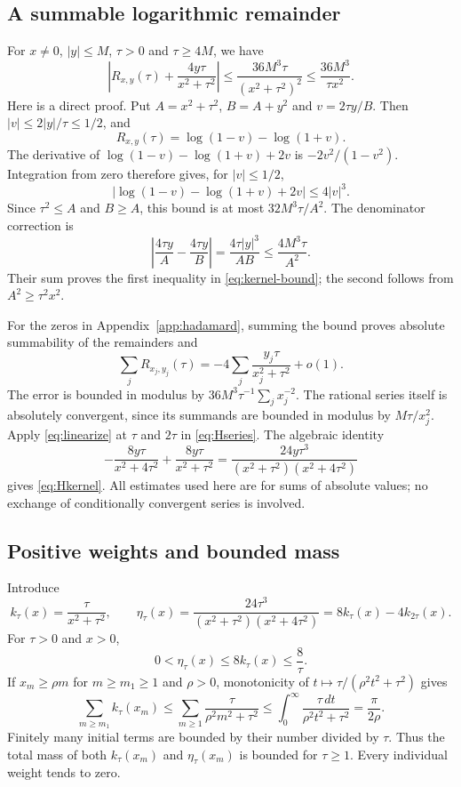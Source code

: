 \documentclass[11pt,a4paper]{article}
\theoremstyle{definition}
\theoremstyle{remark}
\numberwithin{equation}{section}
\begin{document}
\subsection{A summable logarithmic remainder}
For $x\ne0$, $|y|\le M$, $\tau>0$ and $\tau\ge4M$, we have
\begin{equation}\label{eq:kernel-bound}
 \left|R_{x,y}(\tau)+\frac{4y\tau}{x^2+\tau^2}\right|
 \le\frac{36M^3\tau}{(x^2+\tau^2)^2}
 \le\frac{36M^3}{\tau x^2}.
\end{equation}
Here is a direct proof. Put $A=x^2+\tau^2$, $B=A+y^2$ and
$v=2\tau y/B$. Then $|v|\le2|y|/\tau\le1/2$, and
\[
 R_{x,y}(\tau)=\log(1-v)-\log(1+v).
\]
The derivative of $\log(1-v)-\log(1+v)+2v$ is
$-2v^2/(1-v^2)$. Integration from zero therefore gives, for
$|v|\le1/2$,
\[
 |\log(1-v)-\log(1+v)+2v|\le4|v|^3.
\]
Since $\tau^2\le A$ and $B\ge A$, this bound is at most
$32M^3\tau/A^2$. The denominator correction is
\[
 \left|\frac{4\tau y}{A}-\frac{4\tau y}{B}\right|
 =\frac{4\tau|y|^3}{AB}\le\frac{4M^3\tau}{A^2}.
\]
Their sum proves the first inequality in \eqref{eq:kernel-bound};
the second follows from $A^2\ge\tau^2x^2$.

For the zeros in Appendix~\ref{app:hadamard}, summing the bound proves
absolute summability of the remainders and
\begin{equation}\label{eq:linearize}
 \sum_jR_{x_j,y_j}(\tau)
 =-4\sum_j\frac{y_j\tau}{x_j^2+\tau^2}+o(1).
\end{equation}
The error is bounded in modulus by
$36M^3\tau^{-1}\sum_jx_j^{-2}$.
The rational series itself is absolutely convergent, since its summands
are bounded in modulus by $M\tau/x_j^2$.
Apply \eqref{eq:linearize} at $\tau$ and $2\tau$ in
\eqref{eq:Hseries}. The algebraic identity
\begin{equation}\label{eq:difference-kernel}
 -\frac{8y\tau}{x^2+4\tau^2}
 +\frac{8y\tau}{x^2+\tau^2}
 =\frac{24y\tau^3}{(x^2+\tau^2)(x^2+4\tau^2)}
\end{equation}
gives \eqref{eq:Hkernel}. All estimates used here are for sums of
absolute values; no exchange of conditionally convergent series is involved.

\subsection{Positive weights and bounded mass}\label{app:weights}
Introduce
\[
 k_\tau(x)=\frac{\tau}{x^2+\tau^2},\qquad
 \eta_\tau(x)=\frac{24\tau^3}{(x^2+\tau^2)(x^2+4\tau^2)}
            =8k_\tau(x)-4k_{2\tau}(x).
\]
For $\tau>0$ and $x>0$,
\begin{equation}\label{eq:positive-weight}
 0<\eta_\tau(x)\le8k_\tau(x)\le\frac8\tau .
\end{equation}
If $x_m\ge\rho m$ for $m\ge m_1\ge1$ and $\rho>0$, monotonicity
of $t\mapsto\tau/(\rho^2t^2+\tau^2)$ gives
\[
 \sum_{m\ge m_1}k_\tau(x_m)
 \le\sum_{m\ge1}\frac{\tau}{\rho^2m^2+\tau^2}
 \le\int_0^\infty\frac{\tau\,dt}{\rho^2t^2+\tau^2}
 =\frac{\pi}{2\rho}.
\]
Finitely many initial terms are bounded by their number divided by
$\tau$. Thus the total mass of both $k_\tau(x_m)$ and
$\eta_\tau(x_m)$ is bounded for $\tau\ge1$.
Every individual weight tends to zero.
\end{document}
